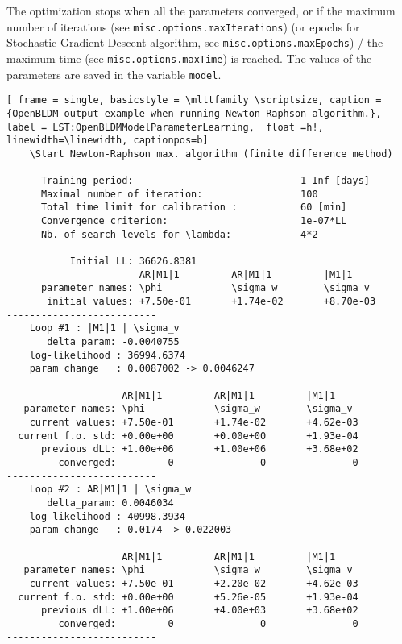 The optimization stops when all the parameters converged, or if the maximum number of iterations (see \lstinline[basicstyle = \mlttfamily \small ]!misc.options.maxIterations!) (or epochs for Stochastic Gradient Descent algorithm, see \lstinline[basicstyle = \mlttfamily \small ]!misc.options.maxEpochs!) / the maximum time (see \lstinline[basicstyle = \mlttfamily \small ]!misc.options.maxTime!) is reached.
The values of the parameters are saved in the variable \lstinline[basicstyle = \mlttfamily \small ]!model!.
 
 \begin{lstlisting}[ frame = single, basicstyle = \mlttfamily \scriptsize, caption = {OpenBLDM output example when running Newton-Raphson algorithm.}, label = LST:OpenBLDMModelParameterLearning,  float =h!, linewidth=\linewidth, captionpos=b]
    \Start Newton-Raphson max. algorithm (finite difference method)

      Training period:                             1-Inf [days]
      Maximal number of iteration:                 100
      Total time limit for calibration :           60 [min]
      Convergence criterion:                       1e-07*LL
      Nb. of search levels for \lambda:            4*2

           Initial LL: 36626.8381
                       AR|M1|1         AR|M1|1         |M1|1            
      parameter names: \phi            \sigma_w        \sigma_v         
       initial values: +7.50e-01       +1.74e-02       +8.70e-03       
--------------------------
    Loop #1 : |M1|1 | \sigma_v 
       delta_param: -0.0040755 
    log-likelihood : 36994.6374
    param change   : 0.0087002 -> 0.0046247

                    AR|M1|1         AR|M1|1         |M1|1           
   parameter names: \phi            \sigma_w        \sigma_v        
    current values: +7.50e-01       +1.74e-02       +4.62e-03      
  current f.o. std: +0.00e+00       +0.00e+00       +1.93e-04      
      previous dLL: +1.00e+06       +1.00e+06       +3.68e+02      
         converged:         0               0               0      
--------------------------
    Loop #2 : AR|M1|1 | \sigma_w 
       delta_param: 0.0046034 
    log-likelihood : 40998.3934
    param change   : 0.0174 -> 0.022003

                    AR|M1|1         AR|M1|1         |M1|1           
   parameter names: \phi            \sigma_w        \sigma_v        
    current values: +7.50e-01       +2.20e-02       +4.62e-03      
  current f.o. std: +0.00e+00       +5.26e-05       +1.93e-04      
      previous dLL: +1.00e+06       +4.00e+03       +3.68e+02      
         converged:         0               0               0      
--------------------------
\end{lstlisting}



